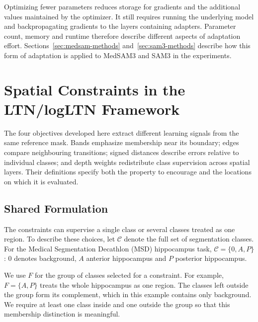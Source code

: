 \documentclass[12pt,a4paper]{article}
\begin{document}
Optimizing fewer parameters reduces storage for gradients and the additional
values maintained by the optimizer. It still requires running the underlying
model and backpropagating gradients to the layers containing adapters.
Parameter count, memory and runtime therefore describe different aspects of
adaptation effort. Sections~\ref{sec:medsam-methods}
and~\ref{sec:sam3-methods} describe how this form of adaptation is applied
to MedSAM3 and SAM3 in the experiments.

\clearpage
\section{Spatial Constraints in the LTN/logLTN Framework}
\label{sec:spatial-constraints}

The four objectives developed here extract different learning signals from
the same reference mask. Bands emphasize membership near its boundary;
edges compare neighbouring transitions; signed distances describe errors
relative to individual classes; and depth weights redistribute class
supervision across spatial layers. Their definitions specify both
the property to encourage and the locations on which it is evaluated.

\subsection{Shared Formulation}\label{sec:constraint-formulation}

The constraints can supervise a single class or several classes treated
as one region. To describe these choices, let $\mathcal C$ denote the full
set of segmentation classes. For the Medical Segmentation Decathlon (MSD)
hippocampus task, $\mathcal C=\{0,A,P\}$: $0$ denotes background,
$A$ anterior hippocampus and $P$ posterior hippocampus.

We use $F$ for the group of classes selected for a constraint. For example,
$F=\{A,P\}$ treats the whole hippocampus as one region. The classes left
outside the group form its complement, which in this example contains
only background. We require at least one class inside and one outside
the group so that this membership distinction is meaningful.
\end{document}
